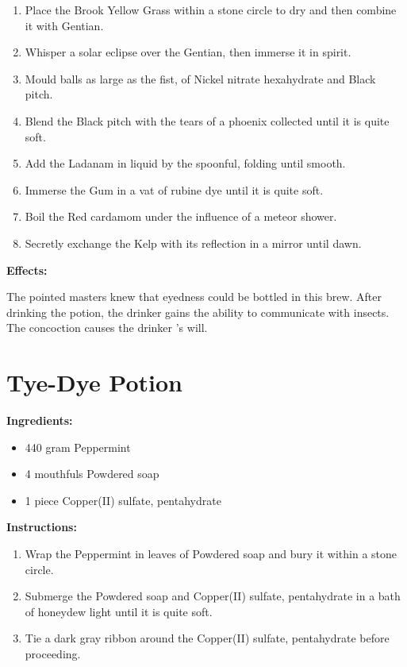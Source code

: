 \documentclass{article}
\begin{document}
\begin{enumerate}
  \item Place the Brook Yellow Grass within a stone circle to dry and then combine it with Gentian.
  \item Whisper a solar eclipse over the Gentian, then immerse it in spirit.
  \item Mould balls as large as the fist, of Nickel nitrate hexahydrate and Black pitch.
  \item Blend the Black pitch with the tears of a phoenix collected until it is quite soft.
  \item Add the Ladanam in liquid by the spoonful, folding until smooth.
  \item Immerse the Gum in a vat of rubine dye until it is quite soft.
  \item Boil the Red cardamom under the influence of a meteor shower.
  \item Secretly exchange the Kelp with its reflection in a mirror until dawn.
\end{enumerate}

\textbf{Effects:}

The pointed masters knew that eyedness could be bottled in this brew. After drinking the potion, the drinker gains the ability to communicate with insects. The concoction causes the drinker 's will.

\newpage
\section*{Tye-Dye Potion}

\textbf{Ingredients:}

\begin{itemize}
  \item 440 gram Peppermint
  \item 4 mouthfuls Powdered soap
  \item 1 piece Copper(II) sulfate, pentahydrate
\end{itemize}

\textbf{Instructions:}

\begin{enumerate}
  \item Wrap the Peppermint in leaves of Powdered soap and bury it within a stone circle.
  \item Submerge the Powdered soap and Copper(II) sulfate, pentahydrate in a bath of honeydew light until it is quite soft.
  \item Tie a dark gray ribbon around the Copper(II) sulfate, pentahydrate before proceeding.
\end{enumerate}
\end{document}
